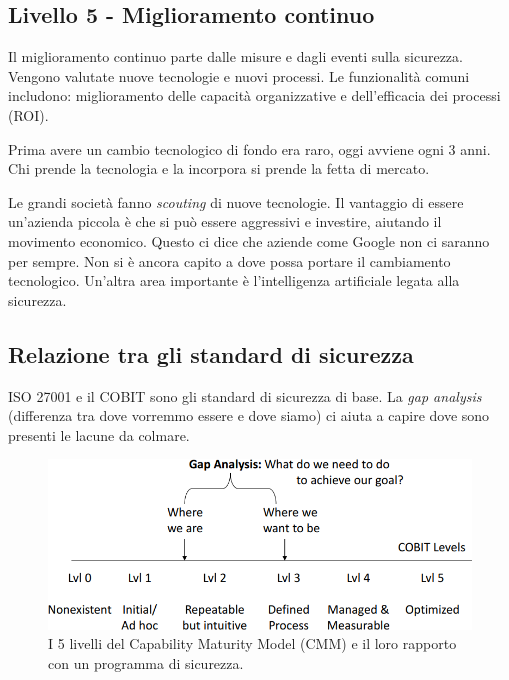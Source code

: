 \subsection{Livello 5 - Miglioramento continuo}

Il miglioramento continuo parte dalle misure e dagli eventi sulla sicurezza.
Vengono valutate nuove tecnologie e nuovi processi. Le funzionalità comuni
includono: miglioramento delle capacità organizzative e dell'efficacia dei
processi (ROI).

Prima avere un cambio tecnologico di fondo era raro, oggi avviene ogni 3 anni.
Chi prende la tecnologia e la incorpora si prende la fetta di mercato.

Le grandi società fanno \textit{scouting} di nuove tecnologie. Il vantaggio di
essere un'azienda piccola è che si può essere aggressivi e investire, aiutando
il movimento economico. Questo ci dice che aziende come Google non ci
saranno per sempre. Non si è ancora capito a dove possa portare il cambiamento
tecnologico. Un'altra area importante è l'intelligenza artificiale legata
alla sicurezza.

\subsection{Relazione tra gli standard di sicurezza}

ISO 27001 e il COBIT sono gli standard di sicurezza di base. La \textit{gap
analysis} (differenza tra dove vorremmo essere e dove siamo) ci aiuta a capire
dove sono presenti le lacune da colmare.

\begin{figure}[h!]
        \begin{center}
                \includegraphics[scale=2.0]{res/img/security_standard}
        \end{center}
        \caption{I 5 livelli del Capability Maturity Model (CMM) e il
        loro rapporto con un programma di sicurezza.}
\end{figure}


